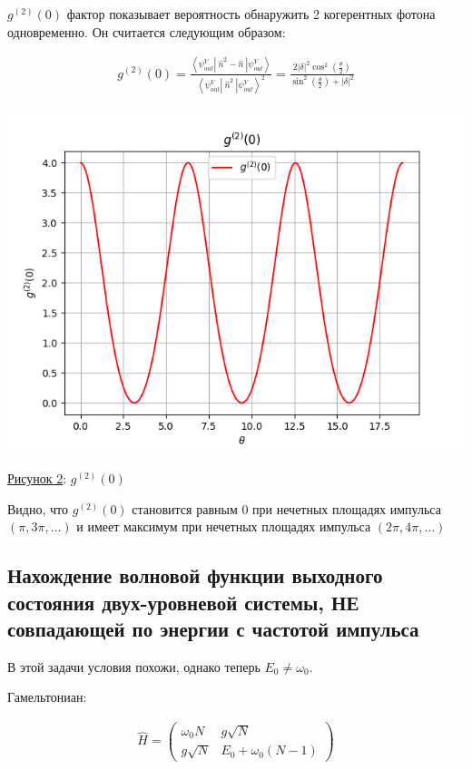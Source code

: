 \documentclass[11pt]{article}    %
\begin{document}
$g^{(2)}(0)$ фактор показывает вероятность обнаружить 2 когерентных фотона одновременно. Он считается следующим образом:

\begin{gather}
    g^{(2)}(0) = \frac{ \left< \psi_{out}^V \left| \ \hat{n}^2 - \hat{n} \ \right| \psi_{out}^V \right>}{\left< \psi_{out}^V \left| \ \hat{n}^2 \ \right| \psi_{out}^V \right> ^2 } = \frac{2\left| \delta \right|^2 \cos^2 \left( \frac{\theta}{2} \right) }{\sin^2 \left( \frac{\theta}{2}\right) + \left| \delta \right|^2}
\end{gather}


\par
\begin{center}
\includegraphics[scale = 1]{plot2.png}
\par
    \underline{Рисунок 2}: $g^{(2)}(0)$
\end{center}
\par Видно, что $g^{(2)}(0)$ становится равным 0 при нечетных площадях импульса $(\pi, 3\pi, \dots)$ и имеет максимум при нечетных площадях импульса $(2\pi, 4\pi, \dots)$

\subsection{Нахождение волновой функции выходного состояния двух-уровневой системы, НЕ совпадающей по энергии с частотой импульса}
В этой задачи условия похожи, однако теперь $E_0 \neq \omega_0 $.
\par Гамельтониан:

\begin{gather}
\hat{H} =
\begin{pmatrix}
    \omega_0 N & g\sqrt{N} \\
    g\sqrt{N} & E_0 + \omega_0 (N-1)
\end{pmatrix}
\end{gather}
\end{document}
